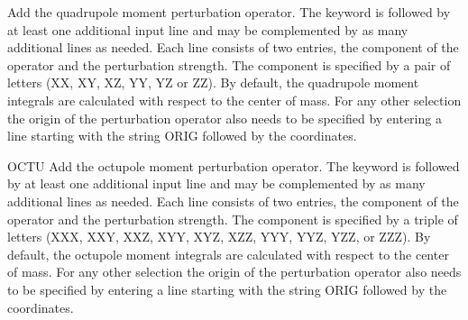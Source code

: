 \begin{keywordlist}
Add the quadrupole moment perturbation operator.
The keyword is followed by at least one additional
input line and may be complemented by as many additional lines as
needed. Each line consists of two entries, the component
of the operator and the perturbation strength. The component is
specified by a pair of letters (XX, XY, XZ, YY, YZ or ZZ).
By default, the quadrupole moment integrals are calculated with
respect to the center of mass. For any other selection
the origin of the perturbation operator also needs to be specified
by entering a line starting with the string ORIG followed by the coordinates.
\item[OCTU]
Add the octupole moment perturbation operator.
The keyword is followed by at least one additional
input line and may be complemented by as many additional lines as
needed. Each line consists of two entries, the component
of the operator and the perturbation strength. The component is
specified by a triple of letters (XXX, XXY, XXZ, XYY, XYZ, XZZ, YYY, YYZ, YZZ, or ZZZ).
By default, the octupole moment integrals are calculated with
respect to the center of mass. For any other selection
the origin of the perturbation operator also needs to be specified
by entering a line starting with the string ORIG followed by the coordinates.

\end{keywordlist}

